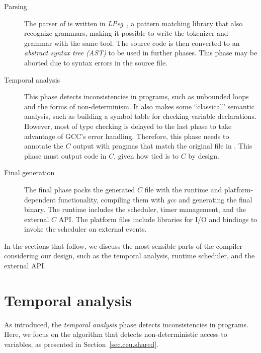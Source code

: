 \begin{description}

\item[Parsing]

The parser of \CEU is written in \emph{LPeg}~\cite{lua.lpeg}, a pattern 
matching library that also recognize grammars, making it possible to write the 
tokenizer and grammar with the same tool.
%
The source code is then converted to an \emph{abstract syntax tree (AST)} to be 
used in further phases.
%
This phase may be aborted due to syntax errors in the \CEU source file.

\item[Temporal analysis]

This phase detects inconsistencies in \CEU programs, such as unbounded loops 
and the forms of non-determinism.
%
It also makes some ``classical'' semantic analysis, such as building a symbol 
table for checking variable declarations.
However, most of type checking is delayed to the last phase to take advantage 
of GCC's error handling.
Therefore, this phase needs to annotate the $C$ output with  
pragmas that match the original file in \CEU.
%
This phase must output code in $C$, given how tied \CEU is to $C$ by design.

\item[Final generation]

The final phase packs the generated $C$ file with the \CEU runtime and 
platform-dependent functionality, compiling them with \emph{gcc} and generating 
the final binary.
%
The \CEU runtime includes the scheduler, timer management, and the external $C$ 
API.
%
The platform files include libraries for I/O and bindings to invoke the \CEU 
scheduler on external events.

\end{description}

In the sections that follow, we discuss the most sensible parts of the compiler 
considering our design, such as the temporal analysis, runtime scheduler, and 
the external API.

\section{Temporal analysis}

As introduced, the \emph{temporal analysis} phase detects inconsistencies in 
\CEU programs.
Here, we focus on the algorithm that detects non-deterministic access to 
variables, as presented in Section~\ref{sec.ceu.shared}.

